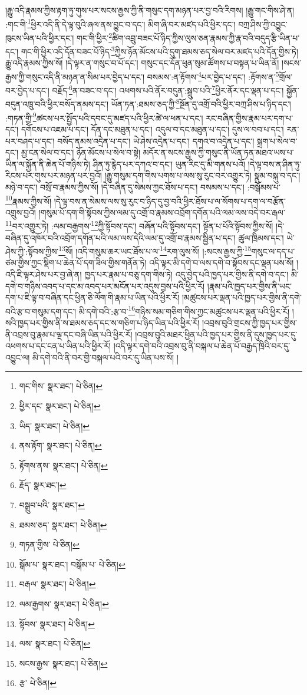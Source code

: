 །རྒྱུ་འདི་རྣམས་ཀྱིས་རྟག་ཏུ་གུས་པར་སངས་རྒྱས་ཀྱི་ནི་གསུང་དག་མཉན་པར་བྱ་བའི་རིགས། །རྒྱུ་གང་གིས་ཤེ་ན། :གང་གི་\footnote{གང་གིས་  སྣར་ཐང་།  པེ་ཅིན། }ཕྱིར་འདི་ནི་དེ་ལྟ་བུའི་ཞལ་ནས་བྱུང་བ་དང་། མིག་ཞི་བར་མཛད་པའི་ཕྱིར་དང་། བཀྲ་ཤིས་ཀྱི་འབྱུང་ཁུངས་ཡིན་པའི་ཕྱིར་དང་། གང་གི་ཕྱིར་\footnote{ཕྱིར་དང་  སྣར་ཐང་།  པེ་ཅིན། }ཚིག་འབྲུ་བཟང་པོ་ཉིད་ཀྱིས་ལུས་ཅན་རྣམས་ཀྱི་རྣ་བའི་བདུད་རྩི་ཡིན་པ་དང་། གང་གི་ཕྱིར་འདི་དོན་བཟང་པོ་ཉིད་\footnote{ཡིད་  སྣར་ཐང་།  པེ་ཅིན། }ཀྱིས་ཉོན་མོངས་པའི་དུག་ཐམས་ཅད་སེལ་བར་མཛད་པའི་དོན་གྱིས་ཏེ། རྒྱུ་འདི་རྣམས་ཀྱིས་སོ། །དེ་ལྟར་ན་གསུང་བ་པོ་དང་། གསུང་དང་དོན་ཕུན་སུམ་ཚོགས་པ་བསྟན་པ་ཡིན་ནོ། །སངས་རྒྱས་ཀྱི་གསུང་འདི་ནི་མཉན་ན་སིམ་པར་བྱེད་པ་དང་། བསམས་:ན་རྟོགས་\footnote{ནས་རྟོག་  སྣར་ཐང་།  པེ་ཅིན། }པར་བྱེད་པ་དང་། :རྟོགས་ན་\footnote{རྟོགས་ནས་  སྣར་ཐང་།  པེ་ཅིན། }གྲོལ་བར་བྱེད་པ་དང་། བརྗོད་\footnote{རྗོད་  སྣར་ཐང་། }ན་བཟང་བ་དང་། འཕགས་པའི་ནོར་བདུན་:སྒྲུབ་པའི་\footnote{བསྒྲུབ་པའི་  སྣར་ཐང་། }ཕྱིར་ནོར་དང་ལྡན་པ་དང་། སྐྱོན་བདུན་འཁྲུ་བའི་ཕྱིར་བསོད་ནམས་དང་། ཡོན་ཏན་:ཐམས་ཅད་ཀྱི་\footnote{ཐམས་ཅད་  སྣར་ཐང་།  པེ་ཅིན། }སྔོན་དུ་འགྲོ་བའི་ཕྱིར་བཀྲ་ཤིས་པ་ཉིད་དང་། :གཏན་གྱི་\footnote{གཏན་གྱིས་  པེ་ཅིན། }ཚངས་པར་སྤྱོད་པའི་དབང་དུ་མཛད་པའི་ཕྱིར་ཚེ་ལ་ཕན་པ་དང་། རང་བཞིན་གྱིས་རྣམ་པར་དག་པ་དང་། དགོངས་པ་འཇམ་པ་དང་། དོན་དང་མཐུན་པ་དང་། འདུལ་བ་དང་མཐུན་པ་དང་། དུས་ལ་བབ་པ་དང་། རན་པར་བཤད་པ་དང་། བསོད་ནམས་འདྲེན་པ་དང་། ཡེ་ཤེས་འདྲེན་པ་དང་། དགའ་བ་འདྲེན་པ་དང་། སྐྲག་པ་སེལ་བ་དང་། མྱ་ངན་སེལ་བ་དང་། ཉོན་མོངས་པ་སེལ་བ་སྟེ། མདོར་ན་སངས་རྒྱས་ཀྱི་གསུང་ནི་ཡོན་ཏན་མཐའ་ཡས་པ་ཡིན་ལ་སྐྱོན་ནི་ཆེན་པོ་གཉིས་ཏེ། ཤིན་ཏུ་རྙེད་པར་དཀའ་བ་དང་། ཡུན་རིང་དུ་མི་གནས་པའོ། །དེ་ལྟ་བས་ན་ཤིན་ཏུ་རིངས་པར་གུས་པར་མཉན་པར་བྱའོ། །རྒྱུ་གསུམ་དག་གིས་པགས་པ་ལས་སུ་རུང་བར་འགྱུར་ཏེ། སྣུམ་བསྐུ་བ་དང་། མཉེ་བ་དང་། བསྲོ་བ་རྣམས་ཀྱིས་སོ། །དེ་བཞིན་དུ་སེམས་ཀྱང་ཐོས་པ་དང་། བསམས་པ་དང་། :བསྒོམས་པ་\footnote{སྒོམ་པ་  སྣར་ཐང་། བསྒོམ་པ་  པེ་ཅིན། }རྣམས་ཀྱིས་སོ། །དེ་ལྟ་བས་ན་སེམས་ལས་སུ་རུང་བ་ཉིད་དུ་བྱ་བའི་ཕྱིར་ཐོས་པ་ལ་སོགས་པ་དག་ལ་བརྩོན་འགྲུས་བྱའོ། །གསུམ་པོ་དག་གི་སྟོབས་ཀྱིས་ལམ་དུ་འགྲོ་བ་རྣམས་འབྲོག་དགོན་པའི་ལམ་ལས་བདེ་བར་རྒལ་\footnote{བརྒལ་  སྣར་ཐང་།  པེ་ཅིན། }བར་འགྱུར་ཏེ། :ལམ་བརྒྱགས་\footnote{ལམ་རྒྱགས་  སྣར་ཐང་།  པེ་ཅིན། }ཀྱི་སྟོབས་དང་། བཞོན་པའི་སྟོབས་དང་། སྟོན་པ་པོའི་སྟོབས་ཀྱིས་སོ། །དེ་བཞིན་དུ་འཁོར་བའི་འབྲོག་དགོན་པའི་ལམ་ལས་དེའི་ལམ་དུ་འགྲོ་བ་རྣམས་སྦྱིན་པ་དང་། ཚུལ་ཁྲིམས་དང་། ཡེ་ཤེས་ཀྱི་:སྟོབས་ཀྱིས་\footnote{སྟོབས་  སྣར་ཐང་།  པེ་ཅིན། }སོ། །འདི་གསུམ་ཆར་ཡང་ཐོས་པ་ལ་\footnote{ལས་  སྣར་ཐང་།  པེ་ཅིན། }རག་ལུས་སོ། །:སངས་རྒྱས་ཀྱི་\footnote{སངས་རྒྱས་  སྣར་ཐང་།  པེ་ཅིན། }གསུང་ལ་དད་པ་ཙམ་གྱིས་ཀྱང་སྡིག་པ་ཆེན་པོ་དག་ཟིལ་གྱིས་གནོན་ཏེ། འདི་ལྟར་མི་དགེ་བ་ལས་དགེ་བ་སྟོབས་དང་ལྡན་པས་སོ། །འདི་ཇི་ལྟར་ཤེས་པར་བྱ་ཞེ་ན། ཁྱད་པར་རྣམ་པ་བཅུ་དག་གིས་ཏེ། འདུ་བྱེད་པའི་ཁྱད་པར་གྱིས་ནི་དགེ་བ་དང་། མི་དགེ་བ་གཉིས་འབད་པ་དང་མ་འབད་པར་མངོན་པར་འདུས་བྱས་པའི་ཕྱིར་རོ། །རྣམ་པའི་ཁྱད་པར་གྱིས་ནི་ཡང་དག་པ་ཇི་ལྟ་བ་བཞིན་དང་ཕྱིན་ཅི་ལོག་གི་རྣམ་པ་ཡིན་པའི་ཕྱིར་རོ། །མཚུངས་པར་ལྡན་པའི་ཁྱད་པར་གྱིས་ནི་དགེ་བའི་རྩ་བ་གསུམ་དག་དང་། མི་དགེ་བའི་:རྩ་བ་\footnote{རྩ་  པེ་ཅིན། }གཉིས་སམ་གཅིག་གིས་ཀྱང་མཚུངས་པར་ལྡན་པའི་ཕྱིར་རོ། །སའི་ཁྱད་པར་གྱིས་ནི་ས་ཐམས་ཅད་དང་ས་གཅིག་པ་ཉིད་ཡིན་པའི་ཕྱིར་རོ། །འབྲས་བུའི་གྲངས་ཀྱི་ཁྱད་པར་གྱིས་ནི་འབྲས་བུ་རྣམ་པ་ལྔ་དང་བཞི་ཡིན་པའི་ཕྱིར་རོ། །འབྲས་བུའི་མཐར་ཕྱིན་པའི་ཁྱད་པར་གྱིས་ནི་དུས་ཁྱད་པར་དུ་འཕགས་པ་དང་ངན་པ་ཡིན་པའི་ཕྱིར་རོ། །འདི་ལྟར་དགེ་བའི་འབྲས་བུ་ནི་བསྐལ་པ་ཆེན་པོ་བརྒྱད་ཁྲིའི་བར་དུ་འབྱུང་ལ། མི་དགེ་བའི་ནི་བར་གྱི་བསྐལ་པའི་བར་དུ་ཡིན་པས་སོ། །
